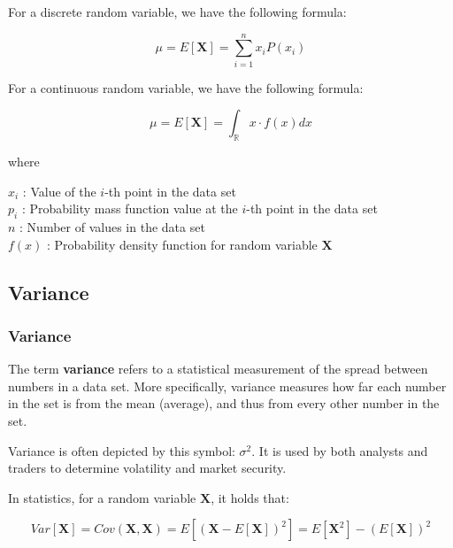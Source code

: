 \documentclass{beamer}
\begin{document}
\begin{frame}

\justifying
For a discrete random variable, we have the following formula:

\begin{block}
\justifying
$$
\mu = E[\mathbf{X}] = \sum_{i=1}^{n} {x_{i}P(x_{i})}
$$
\end{block}

\vspace{0.2cm}
\justifying
For a continuous random variable, we have the following formula:

\begin{block}
\justifying
$$
\mu = E[\mathbf{X}] = \int_{\mathbb{R}} x \cdot f(x)dx
$$
\end{block}

\vspace{0.2cm}
\justifying
where

\vspace{0.2cm}
\justifying
$x_i$ : Value of the $i$-th point in the data set\\
$p_{i}$ :  Probability mass function value at the $i$-th point in the data set\\
$n$ : Number of values in the data set\\
$f(x)$ : Probability density function for random variable $\mathbf{X}$

\end{frame}










\subsection{Variance}

\begin{frame}
\frametitle{\textbf{Variance}}

\begin{definition}
\justifying
The term \textbf{variance} refers to a statistical measurement of the spread between numbers in a data set. More specifically, variance measures how far each number in the set is from the mean (average), and thus from every other number in the set.
\end{definition}

\vspace{0.4cm}
\justifying
Variance is often depicted by this symbol: $\sigma^{2}$. It is used by both analysts and traders to determine volatility and market security.

\vspace{0.4cm}
\justifying
In statistics, for a random variable $\mathbf{X}$, it holds that:

\begin{block}
\justifying
$$
Var[\mathbf{X}] = Cov\left(\mathbf{X},\mathbf{X}\right) = E[\left(\mathbf{X} - E[\mathbf{X}]\right)^{2}] = E[\mathbf{X}^{2}] - \left(E[\mathbf{X}]\right)^{2}
$$
\end{block}


\end{frame}
\end{document}
